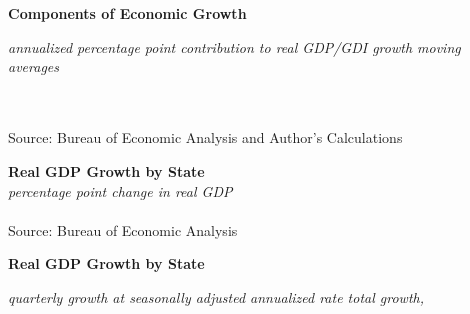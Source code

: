 \documentclass{report}
\begin{document}
\noindent \normalsize \textbf{Components of Economic Growth}\\
\footnotesize{\textit{annualized percentage point contribution to real GDP/GDI growth \hspace{20mm} moving averages}\\ \vspace{4mm}
\hspace*{-2mm} \noindent {} \setlength{\tabcolsep}{3.5pt} \color{black!90}
		{\renewcommand{\arraystretch}{1.55}
		 \begin{tabular}{p{2mm} p{35.2mm} R{8.2mm} R{6.8mm} R{6.8mm} R{6.8mm} R{6.8mm} p{0mm} R{6.8mm} R{6.8mm} R{6.8mm} }

		\end{tabular}}	\\
\footnotesize{Source: Bureau of Economic Analysis and Author's Calculations}
		
\newpage

\noindent \normalsize \textbf{Real GDP Growth by State}\\
\footnotesize{\textit{percentage point change in real GDP}}\\
\vspace{-2mm}
\hspace{-8mm}  \\
\footnotesize{Source: Bureau of Economic Analysis}\\

\vspace{2mm}

\begin{minipage}{0.76\textwidth}

\small  
\end{minipage}

\vspace{2mm}

\normalsize \textbf{Real GDP Growth by State}\\
\footnotesize{\textit{quarterly growth at seasonally adjusted annualized rate \hspace{20mm} total growth, }\\ 

\vspace{-4.5mm}
\hspace{-2mm} \noindent {} \setlength{\tabcolsep}{3.7pt} \color{black!90}
		{\renewcommand{\arraystretch}{1.44}
		 \begin{tabular}{p{30mm} R{7mm} R{7mm} R{7mm} R{7mm} R{7mm} p{0mm} R{9mm} R{9mm} R{10mm} }
 \hline
		\end{tabular}}	\\

}}
\end{document}
